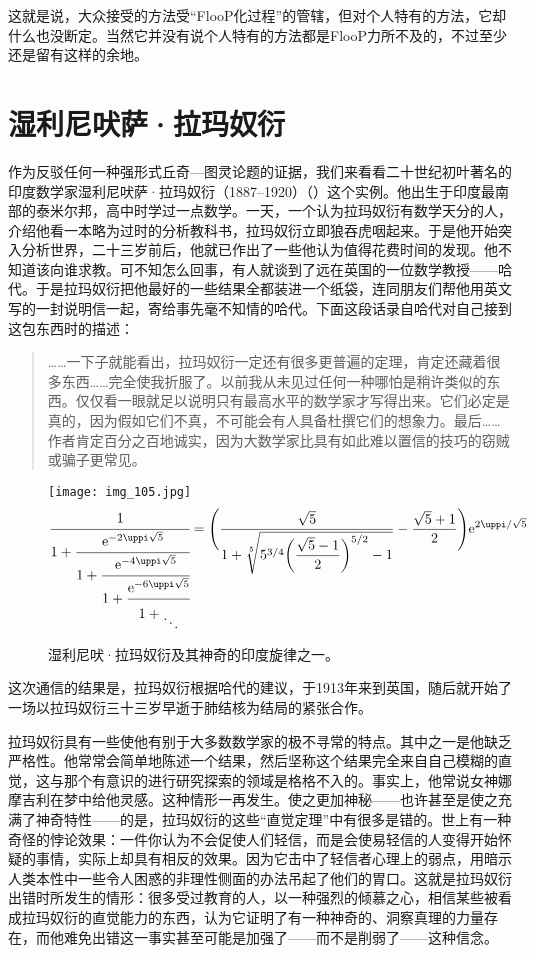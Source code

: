 这就是说，大众接受的方法受“FlooP化过程”的管辖，但对个人特有的方法，它却什么也没断定。当然它并没有说个人特有的方法都是FlooP力所不及的，不过至少还是留有这样的余地。

\section{湿利尼吠萨·拉玛奴衍}

作为反驳任何一种强形式丘奇—图灵论题的证据，我们来看看二十世纪初叶著名的印度数学家湿利尼吠萨·拉玛奴衍（1887--1920）（）这个实例。他出生于印度最南部的泰米尔邦，高中时学过一点数学。一天，一个认为拉玛奴衍有数学天分的人，介绍他看一本略为过时的分析教科书，拉玛奴衍立即狼吞虎咽起来。于是他开始突入分析世界，二十三岁前后，他就已作出了一些他认为值得花费时间的发现。他不知道该向谁求教。可不知怎么回事，有人就谈到了远在英国的一位数学教授——哈代。于是拉玛奴衍把他最好的一些结果全都装进一个纸袋，连同朋友们帮他用英文写的一封说明信一起，寄给事先毫不知情的哈代。下面这段话录自哈代对自己接到这包东西时的描述：

\begin{quote}
……一下子就能看出，拉玛奴衍一定还有很多更普遍的定理，肯定还藏着很多东西……完全使我折服了。以前我从未见过任何一种哪怕是稍许类似的东西。仅仅看一眼就足以说明只有最高水平的数学家才写得出来。它们必定是真的，因为假如它们不真，不可能会有人具备杜撰它们的想象力。最后……作者肯定百分之百地诚实，因为大数学家比具有如此难以置信的技巧的窃贼或骗子更常见。
\end{quote}

\begin{figure}
\texttt{[image: img\_105.jpg]}
\[
\cfrac1{
  1+\cfrac{\me^{-2\uppi\sqrt{5}}}{
    1+\cfrac{\me^{-4\uppi\sqrt{5}}}{
      1+\cfrac{\me^{-6\uppi\sqrt{5}}}{
        \rule{0pt}{\baselineskip}1+\raisebox{-.7\baselineskip}{$\ddots$}}}}}=
\Biggl(
\frac{\sqrt5}{1+\sqrt[5]{5^{3/4}\biggl(\dfrac{\sqrt{5}-1}2\biggr)^{5/2}-1}}
-\frac{\sqrt5+1}2
\Biggr)\me^{2\uppi/\sqrt{5}}
\]
\caption[湿利尼吠萨·拉玛奴衍及其神奇的印度旋律之一。]
  {湿利尼吠·拉玛奴衍及其神奇的印度旋律之一。}
\end{figure}

这次通信的结果是，拉玛奴衍根据哈代的建议，于1913年来到英国，随后就开始了一场以拉玛奴衍三十三岁早逝于肺结核为结局的紧张合作。

拉玛奴衍具有一些使他有别于大多数数学家的极不寻常的特点。其中之一是他缺乏严格性。他常常会简单地陈述一个结果，然后坚称这个结果完全来自自己模糊的直觉，这与那个有意识的进行研究探索的领域是格格不入的。事实上，他常说女神娜摩吉利在梦中给他灵感。这种情形一再发生。使之更加神秘——也许甚至是使之充满了神奇特性——的是，拉玛奴衍的这些“直觉定理”中有很多是错的。世上有一种奇怪的悖论效果：一件你认为不会促使人们轻信，而是会使易轻信的人变得开始怀疑的事情，实际上却具有相反的效果。因为它击中了轻信者心理上的弱点，用暗示人类本性中一些令人困惑的非理性侧面的办法吊起了他们的胃口。这就是拉玛奴衍出错时所发生的情形：很多受过教育的人，以一种强烈的倾慕之心，相信某些被看成拉玛奴衍的直觉能力的东西，认为它证明了有一种神奇的、洞察真理的力量存在，而他难免出错这一事实甚至可能是加强了——而不是削弱了——这种信念。

